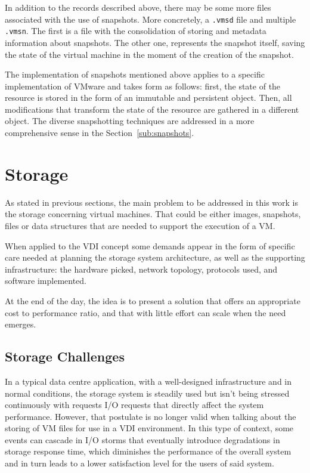 In addition to the records described above, there may be some more files associated with the use of snapshots. More concretely, a \texttt{.vmsd} file and multiple \texttt{.vmsn}. The first is a file with the consolidation of storing and metadata information about snapshots. The other one, represents the snapshot itself, saving the state of the virtual machine in the moment of the creation of the snapshot.

The implementation of snapshots mentioned above applies to a specific implementation of VMware and takes form as follows: first, the state of the resource is stored in the form of an immutable and persistent object. Then, all modifications that transform the state of the resource are gathered in a different object. 
The diverse snapshotting techniques are addressed in a more comprehensive sense in the Section~\ref{sub:snapshots}.


\section{Storage} %
\label{sec:storage}

As stated in previous sections, the main problem to be addressed in this work is the storage concerning virtual machines. That could be either images, snapshots, files or data structures that are needed to support the execution of a VM. 

When applied to the VDI concept some demands appear in the form of specific care needed at planning the storage system architecture, as well as the supporting infrastructure: the hardware picked, network topology, protocols used, and software implemented.

At the end of the day, the idea is to present a solution that offers an appropriate cost to performance ratio, and that with little effort can scale when the need emerges.


\subsection{Storage Challenges}
\label{sub:storage_challenges}

In a typical data centre application, with a well-designed infrastructure and in normal conditions, the storage system is steadily used but isn't being stressed continuously with requests I/O requests that directly affect the system performance. However, that postulate is no longer valid when talking about the storing of VM files for use in a VDI environment. In this type of context, some events can cascade in I/O storms that eventually introduce degradations in storage response time, which diminishes the performance of the overall system and in turn leads to a lower satisfaction level for the users of said system.

